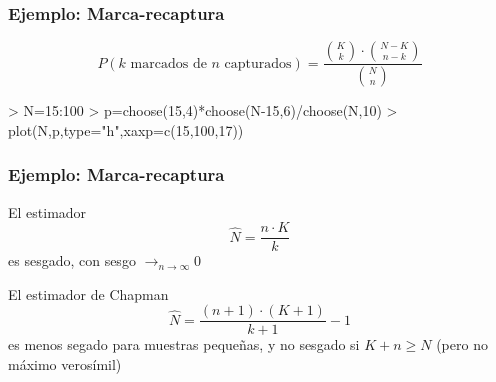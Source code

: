 \documentclass[12pt,t]{beamer}
\renewcommand{\emph}[1]{{\color{red}#1}}
\renewcommand{\geq}{\geqslant}
\def\tendeix{{\displaystyle\mathop{\longrightarrow}_{\scriptscriptstyle
n\to\infty}}}
\theoremstyle{plain}
\theoremstyle{definition}
\begin{document}
\begin{frame}[fragile]
\frametitle{Ejemplo: Marca-recaptura}
\vspace*{-0.8cm}

$$
P(\mbox{$k$ marcados de $n$ capturados})=\dfrac{\binom{K}{k}\cdot \binom{N-K}{n-k}}{\binom{N}{n}}
$$

\begin{Schunk}
\begin{Sinput}
> N=15:100
> p=choose(15,4)*choose(N-15,6)/choose(N,10)
> plot(N,p,type="h",xaxp=c(15,100,17))
\end{Sinput}
\end{Schunk}



\end{frame}


\begin{frame}
\frametitle{Ejemplo: Marca-recaptura}

El estimador
$$
\widehat{N}=\frac{n\cdot K}{k}
$$
es sesgado, con sesgo $\tendeix 0$
\bigskip

El \emph{estimador de Chapman}
$$
\widehat{N}=\frac{(n+1)\cdot (K+1)}{k+1}-1
$$
es menos segado para  muestras pequeñas, y no sesgado si $K+n\geq N$ (pero no máximo verosímil)
\end{frame}
\end{document}
